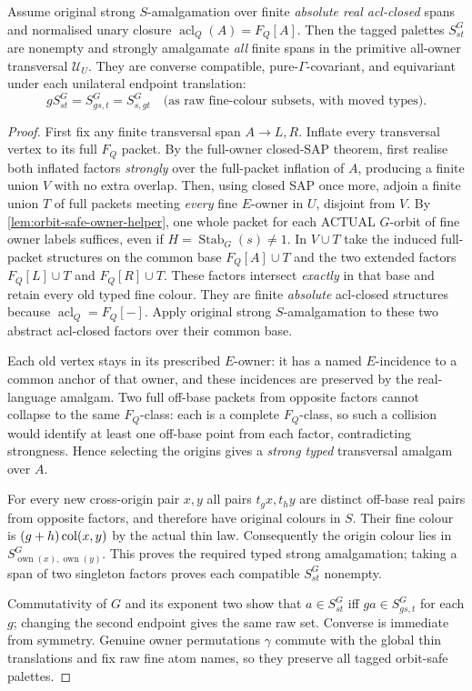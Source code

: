\begin{lemma}
\label{lem:orbit-safe-strong}
Assume original strong $S$-amalgamation over finite
\emph{absolute real acl-closed} spans and normalised unary
closure $\operatorname{acl}_{Q}(A)=F_Q[A]$.
Then the tagged palettes $S^G_{st}$ are nonempty and
strongly amalgamate \emph{all} finite spans in the
primitive all-owner transversal $\mathcal U_U$.
They are converse compatible, pure-$\Gamma$-covariant,
and equivariant under each unilateral endpoint translation:
\[
     gS^G_{st}=S^G_{gs,t}=S^G_{s,gt}
       \quad\text{(as raw fine-colour subsets, with moved types).}
\]
\end{lemma}
\begin{proof}
First fix any finite transversal span $A\to L,R$.  Inflate
every transversal vertex to its full $F_Q$ packet.  By the
full-owner closed-SAP theorem, first realise both inflated
factors \emph{strongly} over the full-packet inflation of
$A$, producing a finite union $V$ with no extra overlap.
Then, using closed SAP once more, adjoin a finite union $T$
of full packets meeting \emph{every} fine $E$-owner in $U$,
disjoint from $V$. By
\cref{lem:orbit-safe-owner-helper},
one whole packet for each ACTUAL $G$-orbit
of fine owner labels suffices, even if
$H=\operatorname{Stab}_G(s)\ne1$.  In $V\cup T$ take the induced full-packet
structures on the common base $F_Q[A]\cup T$ and the two
extended factors $F_Q[L]\cup T$ and $F_Q[R]\cup T$.
These factors intersect \emph{exactly} in that base and
retain every old typed fine colour.  They are finite
\emph{absolute} acl-closed structures because
$\operatorname{acl}_Q=F_Q[-]$.
Apply original strong $S$-amalgamation to these two abstract
acl-closed factors over their common base.

Each old vertex stays in its prescribed $E$-owner: it has a
named $E$-incidence to a common anchor of that owner, and
these incidences are preserved by the real-language amalgam.
Two full off-base packets from opposite factors cannot
collapse to the same $F_Q$-class: each is a complete
$F_Q$-class, so such a collision would identify at least
one off-base point from each factor, contradicting strongness.
Hence selecting the origins gives a \emph{strong typed}
transversal amalgam over $A$.

For every new cross-origin pair $x,y$ all pairs
$t_gx,t_hy$ are distinct off-base real pairs from
opposite factors, and therefore have original colours in
$S$.  Their fine colour is $(g+h)\operatorname{col}(x,y)$ by the actual
thin law.  Consequently the origin colour lies in
$S^G_{\operatorname{own}(x),\operatorname{own}(y)}$.
This proves the required typed strong amalgamation;
taking a span of two singleton factors proves each
compatible $S^G_{st}$ nonempty.

Commutativity of $G$ and its exponent two show that
$a\in S^G_{st}$ iff $ga\in S^G_{gs,t}$ for each $g$;
changing the second endpoint gives the same raw set.
Converse is immediate from symmetry.  Genuine owner
permutations $\gamma$ commute with the global thin
translations and fix raw fine atom names, so they preserve
all tagged orbit-safe palettes.
\end{proof}

